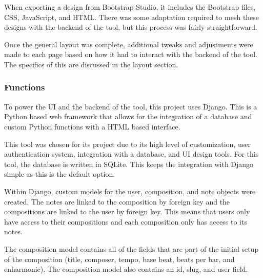 \vspace{\baselineskip}

When exporting a design from Bootstrap Studio, it includes the Bootstrap files, CSS, JavaScript, and HTML.  There was some adaptation required to mesh these designs with the backend of the tool, but this process was fairly straightforward.

\vspace{\baselineskip}

Once the general layout was complete, additional tweaks and adjustments were made to each page based on how it had to interact with the backend of the tool.  The specifics of this are discussed in the layout section.

\subsubsection{Functions}
\label{subsubsec:processfunctions}

To power the UI and the backend of the tool, this project uses Django.  This is a Python based web framework that allows for the integration of a database and custom Python functions with a HTML based interface.

\vspace{\baselineskip}

This tool was chosen for its project due to its high level of customization, user authentication system, integration with a database, and UI design tools.  For this tool, the database is written in SQLite.  This keeps the integration with Django simple as this is the default option.

\vspace{\baselineskip}

Within Django, custom models for the user, composition, and note objects were created.  The notes are linked to the composition by foreign key and the compositions are linked to the user by foreign key.  This means that users only have access to their compositions and each composition only has access to its notes.

\vspace{\baselineskip}

The composition model contains all of the fields that are part of the initial setup of the composition (title, composer, tempo, base beat, beats per bar, and enharmonic).  The composition model also contains an id, slug, and user field. 

\vspace{\baselineskip}

